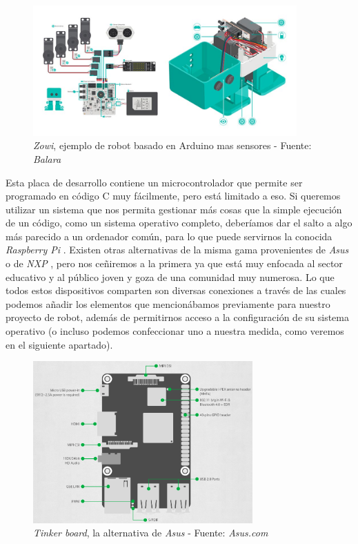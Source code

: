 \begin{figure}[h]
	\centering
	\includegraphics[width=0.9\textwidth]{imagenes/zowi-robot-componentes.jpg}
	\caption{\textit{Zowi}, ejemplo de robot basado en Arduino mas sensores - Fuente: \textit{Balara} \cite{zowi-balara}}
\end{figure}

Esta placa de desarrollo contiene un microcontrolador que permite ser programado en código C muy fácilmente, pero está limitado a eso. Si queremos utilizar un sistema que nos permita gestionar más cosas que la simple ejecución de un código, como un sistema operativo completo, deberíamos dar el salto a algo más parecido a un ordenador común, para lo que puede servirnos la conocida \textit{Raspberry Pi} \cite{raspberry-pi}. Existen otras alternativas de la misma gama provenientes de \textit{Asus} o de \textit{NXP} \cite{nxp-imx}, pero nos ceñiremos a la primera ya que está muy enfocada al sector educativo y al público joven y goza de una comunidad muy numerosa. Lo que todos estos dispositivos comparten son diversas conexiones a través de las cuales podemos añadir los elementos que mencionábamos previamente para nuestro proyecto de robot, además de permitirnos acceso a la configuración de su sistema operativo (o incluso podemos confeccionar uno a nuestra medida, como veremos en el siguiente apartado).\\

\begin{figure}[h]
	\centering
	\includegraphics[width=0.75\textwidth]{imagenes/asus-tinker-conexiones.png}
	\caption{\textit{Tinker board}, la alternativa de \textit{Asus} - Fuente: \textit{Asus.com} \cite{asus-tinker}}
\end{figure}


